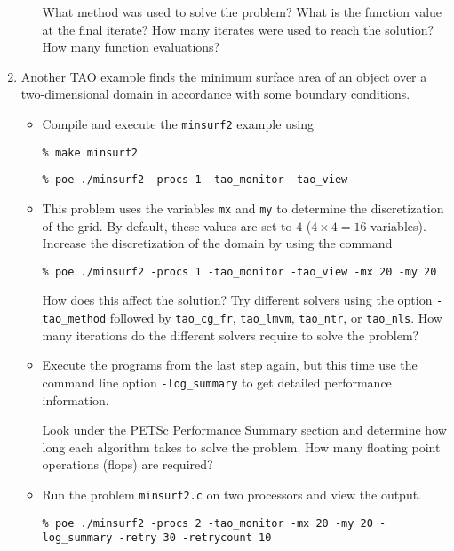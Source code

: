 \documentclass[11pt]{article}
\begin{document}
\begin{enumerate}
\begin{itemize}
  What method was used to solve the problem?
  What is the function value at the final iterate? 
  How many iterates were used to reach the solution?  
  How many function evaluations?

 \newpage

\end{itemize}

\item
Another TAO example finds the minimum surface area of an object over a
two-dimensional domain in accordance with some boundary conditions.

\begin{itemize}

\item
Compile and execute the \texttt{minsurf2} example using
    
\texttt{\% make minsurf2}

\texttt{\% poe ./minsurf2 -procs 1 -tao\_monitor -tao\_view}

\item
This problem uses the variables {\tt mx} and {\tt my} to determine
the discretization of the grid.  By default, these values are set to
$4$ ($4 \times 4 = 16$ variables). Increase the discretization of the 
domain by using the command 

\texttt{\% poe ./minsurf2 -procs 1 -tao\_monitor -tao\_view -mx 20 -my 20}

How does this affect the solution?
Try different solvers using the option \texttt{-tao\_method} followed by
\texttt{tao\_cg\_fr},
\texttt{tao\_lmvm}, \texttt{tao\_ntr}, or \texttt{tao\_nls}.
How many iterations do the different solvers require to solve the problem?

\item
Execute the programs from the last step again, but this time use the command line option 
\texttt{-log\_summary} to get detailed performance information.

Look under the PETSc Performance Summary section and determine how long
each algorithm takes to solve the problem. How many floating point operations (flops) are required? 


\item
Run the problem \texttt{minsurf2.c} on two processors and view the output.

\texttt{\% poe ./minsurf2 -procs 2 -tao\_monitor -mx 20 -my 20 -log\_summary -retry 30 -retrycount 10}

\end{itemize}


\end{enumerate}
\end{document}
